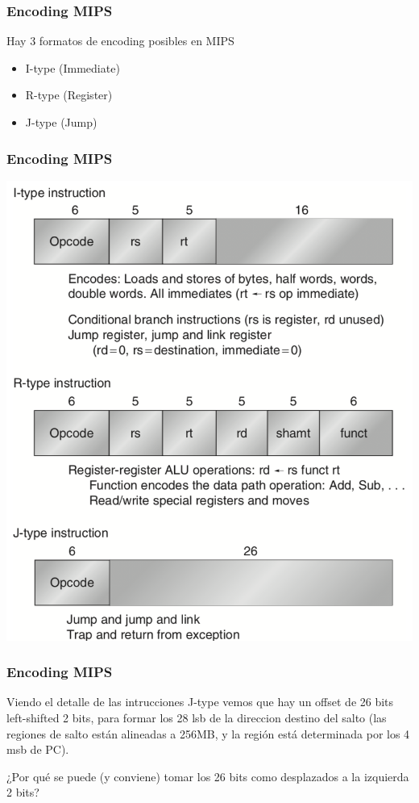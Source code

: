 \documentclass{beamer}
\begin{document}
\begin{frame}
 \frametitle{Encoding MIPS} 
 Hay 3 formatos de encoding posibles en MIPS
 \begin{itemize}
  \item I-type (Immediate)
  \item R-type (Register)
  \item J-type (Jump)
 \end{itemize}
\end{frame}

\begin{frame}
 \frametitle{Encoding MIPS} 
 
 \begin{center}
 \includegraphics[scale=.4,keepaspectratio=true]{tipos_instruccion.png}
\end{center}
 \end{frame}


\begin{frame}
 \frametitle{Encoding MIPS} 

 Viendo el detalle de las intrucciones J-type vemos que hay un offset de 26 bits left-shifted 2 bits, para formar los 28 lsb de la direccion destino del salto (las regiones de salto están alineadas a 256MB, y la región está determinada por los 4 msb de PC).
 
 \bigskip

 ¿Por qué se puede (y conviene) tomar los 26 bits como desplazados a la izquierda 2 bits?
\end{frame}
\end{document}
